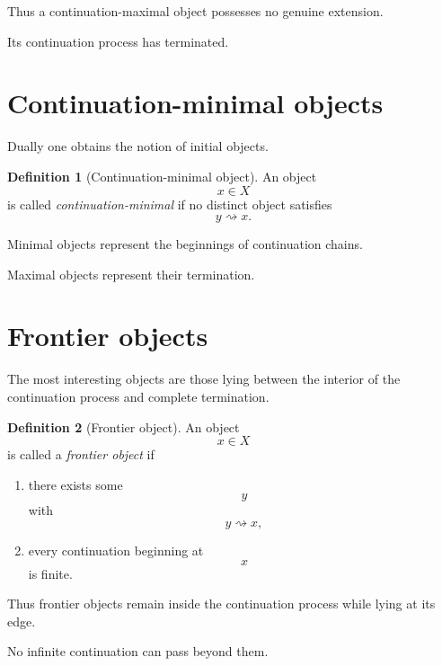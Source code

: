 \documentclass[13pt,openany]{book}
\theoremstyle{plain}
\theoremstyle{definition}
\newtheorem{definition}{Definition}[chapter]
\begin{document}
Thus a continuation-maximal object possesses no genuine extension.

Its continuation process has terminated.


\section{Continuation-minimal objects}

Dually one obtains the notion of initial objects.

\begin{definition}[Continuation-minimal object]
An object
\[
x\in X
\]
is called \emph{continuation-minimal}
if no distinct object satisfies
\[
y\rightsquigarrow x.
\]
\end{definition}

Minimal objects represent the beginnings of continuation chains.

Maximal objects represent their termination.


\section{Frontier objects}

The most interesting objects are those lying between the interior of the
continuation process and complete termination.

\begin{definition}[Frontier object]
An object
\[
x\in X
\]
is called a \emph{frontier object}
if

\begin{enumerate}
\item
there exists some
\[
y
\]
with
\[
y\rightsquigarrow x,
\]

\item
every continuation beginning at
\[
x
\]
is finite.
\end{enumerate}

\end{definition}

Thus frontier objects remain inside the continuation process while lying at
its edge.

No infinite continuation can pass beyond them.

\end{document}

